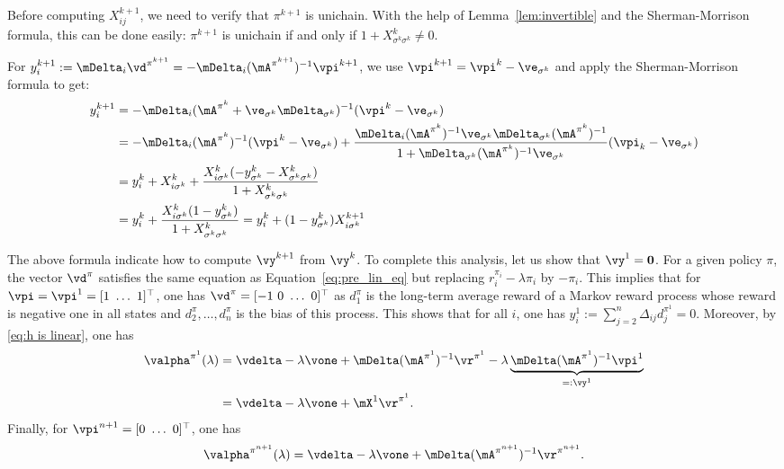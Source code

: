 Before computing $X^{k+1}_{ij}$, we need to verify that $\pi^{k+1}$ is unichain.
With the help of Lemma~\ref{lem:invertible} and the Sherman-Morrison formula, this can be done easily: $\pi^{k+1}$ is unichain if and only if $1+X^k_{\sigma^k\sigma^k}\neq0$. 

For $y^{k+1}_i := \mDelta_{i}\vd^{\pi^{k+1}} = -\mDelta_i(\mA^{\pi^{k+1}})^{-1} \vpi^{k+1}$, we use $\vpi^{k+1}=\vpi^k - \ve_{\sigma^k}$ and apply the Sherman-Morrison formula to get:
\begin{align}
    y^{k+1}_i &= -\mDelta_i(\mA^{\pi^{k}}+\ve_{\sigma^k}\mDelta_{\sigma^k})^{-1} (\vpi^k-\ve_{\sigma^k})\nonumber\\
              &= -\mDelta_i (\mA^{\pi^{k}})^{-1}(\vpi^k-\ve_{\sigma^k})  + \frac{\mDelta_i (\mA^{\pi^{k}})^{-1} \ve_{\sigma^k}\mDelta_{\sigma^k}(\mA^{\pi^{k}})^{-1}}{1 + \mDelta_{\sigma^k} (\mA^{\pi^{k}})^{-1} \ve_{\sigma^k}} (\vpi_k-\ve_{\sigma^k})\nonumber\\
    &= y^k_i + X^k_{i\sigma^k} + \frac{X^k_{i\sigma^k}(-y^k_{\sigma^k} - X^{k}_{\sigma^k\sigma^k})}{1+X^{k}_{\sigma^k\sigma^k}}\nonumber\\
    &= y^k_i + \frac{X^k_{i\sigma^k}(1-y^k_{\sigma^k})}{1+X^{k}_{\sigma^k\sigma^k}} =y^k_i +(1-y^k_{\sigma^k})X^{k+1}_{i\sigma^k}\label{eq:y^k+1-i}
\end{align}

The above formula indicate how to compute $\vy^{k+1}$ from $\vy^k$. To complete this analysis, let us show that $\vy^1=\mathbf{0}$. For a given policy $\pi$, the vector $\vd^{\pi}$ satisfies the same equation as Equation~\eqref{eq:pre_lin_eq} but replacing $r^{\pi_i}_i-\lambda\pi_i$ by $-\pi_i$. This implies that for $\vpi=\vpi^1=[1\ \dots\ 1]^\top$, one has $\vd^\pi=[-1\ 0\ \dots\ 0]^\top$ as $d^\pi_1$ is the long-term average reward of a Markov reward process whose reward is negative one in all states and $d^\pi_2,\dots, d^\pi_n$ is the bias of this process.  This shows that for all $i$, one has
$y^{1}_i:=\sum_{j=2}^n\Delta_{ij}d_j^{\pi^{1}}=0$.
Moreover, by \eqref{eq:h is linear}, one has
\begin{align}
    \valpha^{\pi^1}(\lambda)
    &=\vdelta -\lambda\vone +\mDelta(\mA^{\pi^1})^{-1}\vr^{\pi^1} -\lambda\underbrace{\mDelta(\mA^{\pi^1})^{-1}\vpi^1}_{=:\vy^1} \nonumber\\
    &=\vdelta -\lambda\vone +\mX^1\vr^{\pi^1}. \label{eq:b_pi_one}
\end{align}
Finally, for $\vpi^{n+1}=[0\ \dots\ 0]^\top$, one has
\begin{equation}
    \label{eq:b_pi_n1}
    \valpha^{\pi^{n+1}}(\lambda)
    =\vdelta -\lambda\vone +\mDelta(\mA^{\pi^{n+1}})^{-1}\vr^{\pi^{n+1}}.
\end{equation}

